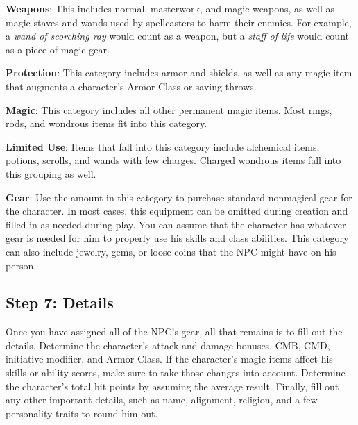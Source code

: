 \textbf{Weapons}: This includes normal, masterwork, and magic weapons, as well as magic staves and wands used by spellcasters to harm their enemies. For example, a \textit{wand of scorching ray} would count as a weapon, but a \textit{staff of life} would count as a piece of magic gear.
				
\textbf{Protection}: This category includes armor and shields, as well as any magic item that augments a character's Armor Class or saving throws.
				
\textbf{Magic}: This category includes all other permanent magic items. Most rings, rods, and wondrous items fit into this category.
				
\textbf{Limited Use}: Items that fall into this category include alchemical items, potions, scrolls, and wands with few charges. Charged wondrous items fall into this grouping as well.
				
\textbf{Gear}: Use the amount in this category to purchase standard nonmagical gear for the character. In most cases, this equipment can be omitted during creation and filled in as needed during play. You can assume that the character has whatever gear is needed for him to properly use his skills and class abilities. This category can also include jewelry, gems, or loose coins that the NPC might have on his person.
				
\subsection{Step 7: Details}
				
Once you have assigned all of the NPC's gear, all that remains is to fill out the details. Determine the character's attack and damage bonuses, CMB, CMD, initiative modifier, and Armor Class. If the character's magic items affect his skills or ability scores, make sure to take those changes into account. Determine the character's total hit points by assuming the average result. Finally, fill out any other important details, such as name, alignment, religion, and a few personality traits to round him out.
			        	